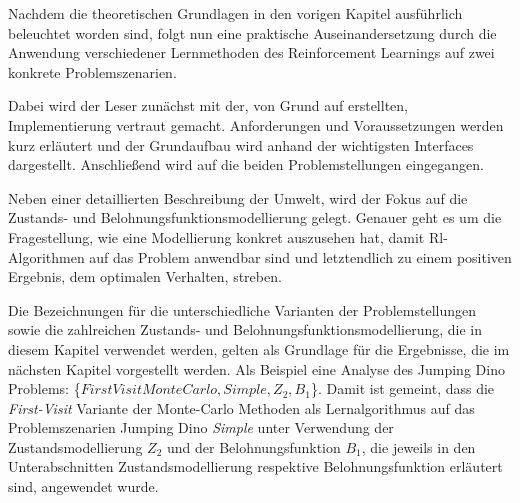 Nachdem die theoretischen Grundlagen in den vorigen Kapitel ausführlich beleuchtet worden sind, folgt nun eine praktische Auseinandersetzung durch die Anwendung verschiedener Lernmethoden des Reinforcement Learnings auf zwei konkrete Problemszenarien. 
\par 
Dabei wird der Leser zunächst mit der, von Grund auf erstellten, Implementierung vertraut gemacht. Anforderungen und Voraussetzungen werden kurz erläutert und der Grundaufbau wird anhand der wichtigsten Interfaces dargestellt. Anschließend wird auf die beiden Problemstellungen eingegangen. 
\par 
Neben einer detaillierten Beschreibung der Umwelt, wird der Fokus auf die Zustands- und Belohnungsfunktionsmodellierung gelegt. Genauer geht es um die Fragestellung, wie eine Modellierung konkret auszusehen hat, damit Rl-Algorithmen auf das Problem anwendbar sind und letztendlich zu einem positiven Ergebnis, dem optimalen Verhalten, streben.
\par
Die Bezeichnungen für die unterschiedliche Varianten der Problemstellungen sowie die zahlreichen Zustands- und Belohnungsfunktionsmodellierung, die in diesem Kapitel verwendet werden, gelten als Grundlage für die Ergebnisse, die im nächsten Kapitel vorgestellt werden. Als Beispiel eine Analyse des Jumping Dino Problems: \{$FirstVisitMonteCarlo,Simple, Z_2, B_1$\}. Damit ist gemeint, dass die \textit{First-Visit }Variante der Monte-Carlo Methoden als Lernalgorithmus auf das Problemszenarien Jumping Dino \textit{Simple} unter Verwendung der Zustandsmodellierung $Z_2$ und der Belohnungsfunktion $B_1$, die jeweils in den Unterabschnitten \glqq Zustandsmodellierung\grqq{} respektive \glqq Belohnungsfunktion\grqq{} erläutert sind, angewendet wurde.
